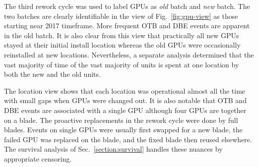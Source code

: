 The third rework cycle was used to label GPUs as {\em old} batch and
{\em new} batch. The two batches are clearly identifiable in the
 view of Fig.~\ref{fig:gpu-view} as those starting near 2017
timeframe. More frequent OTB and DBE events are apparent in the old
batch. It is also clear from this view that practically all new GPUs
stayed at their initial install location whereas the old GPUs were
occasionally reinstalled at new locations. Nevertheless, a separate
analysis determined that the vast majority of time of the vast
majority of units is spent at one location by both the new and the old
units.

The location view shows that each location was operational almost all
the time with small gaps when GPUs were changed out. It is also
notable that OTB and DBE events are associated with a single GPU
although four GPUs are together on a blade. The proactive replacements
in the rework cycle were done by full blades. Events on single GPUs
were usually first swapped for a new blade, the failed GPU was
replaced on the blade, and the fixed blade then reused elsewhere. The
survival analysis of Sec.~\ref{section:survival} handles these nuances
by appropriate censoring.
